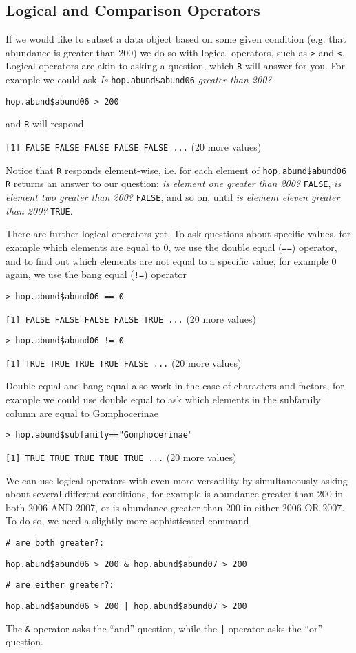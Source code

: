 \documentclass[12pt]{article}
\newcommand{\R}[1] {
	\item \texttt{#1}
}
\newenvironment{verbatim}{ 
	\indent
	\begin{list}{}{\setlength{\itemsep}{-1.5mm}}
}{
	\end{list}
}
\begin{document}
\subsection{Logical and Comparison Operators}
If we would like to subset a data object based on some given condition (e.g. that abundance is greater than 200) we do so with logical operators, such as \verb+>+ and \verb+<+.  Logical operators are akin to asking a question, which \verb+R+ will answer for you.  For example we could ask \emph{Is} \verb+hop.abund$abund06+ \emph{greater than 200?}
\begin{verbatim}
	\R{hop.abund\$abund06 > 200}
\end{verbatim}
and \verb+R+ will respond
\begin{verbatim}
	\R{[1] FALSE FALSE FALSE FALSE FALSE ...}(20 more values)
\end{verbatim}
Notice that \verb+R+ responds element-wise, i.e. for each element of \verb+hop.abund$abund06 R+ returns an answer to our question: \emph{is element one greater than 200?} \verb+FALSE+, \emph{is element two greater than 200?} \verb+FALSE+, and so on, until \emph{is element eleven greater than 200?} \verb+TRUE+.

There are further logical operators yet.  To ask questions about specific values, for example which elements are equal to 0, we use the double equal (\verb+==+) operator, and to find out which elements are not equal to a specific value, for example 0 again, we use the bang equal (\verb+!=+) operator
\begin{verbatim}
	\R{> hop.abund\$abund06 == 0}
	\R{[1] FALSE FALSE FALSE FALSE TRUE ...}(20 more values)
	\R{> hop.abund\$abund06 != 0}
	\R{[1] TRUE TRUE TRUE TRUE FALSE ...}(20 more values)
\end{verbatim}
Double equal and bang equal also work in the case of characters and factors, for example we could use double equal to ask which elements in the subfamily column are equal to Gomphocerinae
\begin{verbatim}
	\R{> hop.abund\$subfamily=="Gomphocerinae"}
	\R{[1] TRUE TRUE TRUE TRUE TRUE ...}(20 more values)
\end{verbatim}

We can use logical operators with even more versatility by simultaneously asking about several different conditions, for example is abundance greater than 200 in both 2006 AND 2007, or is abundance greater than 200 in either 2006 OR 2007.  To do so, we need a slightly more sophisticated command
\begin{verbatim}
	\R{\# are both greater?:}
	\R{hop.abund\$abund06 > 200 \& hop.abund\$abund07 > 200}
	\R{\# are either greater?:}
	\R{hop.abund\$abund06 > 200 | hop.abund\$abund07 > 200}
\end{verbatim}
The \verb+&+ operator asks the ``and'' question, while the \verb+|+ operator asks the ``or'' question.
\end{document}
